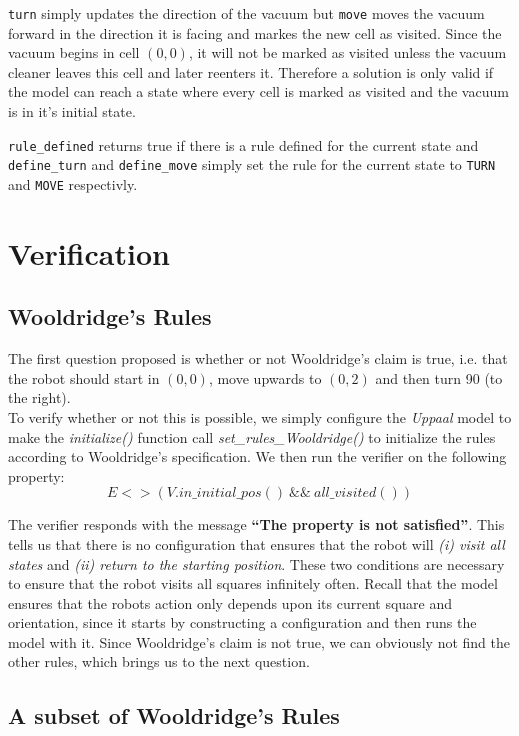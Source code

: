 \documentclass{article}
\begin{document}
    \texttt{turn} simply updates the direction of the vacuum but \texttt{move} moves the vacuum forward in the direction it is facing and markes the new cell as visited. Since the vacuum begins in cell $(0,0)$, it will not be marked as visited unless the vacuum cleaner leaves this cell and later reenters it. Therefore a solution is only valid if the model can reach a state where every cell is marked as visited and the vacuum is in it's initial state.

    \texttt{rule\_defined} returns true if there is a rule defined for the current state and \texttt{define\_turn} and \texttt{define\_move} simply set the rule for the current state to \texttt{TURN} and \texttt{MOVE} respectivly.




\section{Verification}

\subsection{Wooldridge's Rules}

The first question proposed is whether or not Wooldridge's claim is true, i.e. that the robot should start in $(0,0)$, move upwards to $(0,2)$ and then turn 90\degree{} (to the right).
\\
To verify whether or not this is possible, we simply configure the \textit{Uppaal} model to make the \textit{initialize()} function call \textit{set\_rules\_Wooldridge()} to initialize the rules according to Wooldridge's specification.
We then run the verifier on the following property:
\[ E<>(V.in\_initial\_pos() ~ \&\& ~ all\_visited()) \]

The verifier responds with the message \textbf{``The property is not satisfied''}.
This tells us that there is no configuration that ensures that the robot will \textit{(i) visit all states} and \textit{(ii) return to the starting position}. 
These two conditions are necessary to ensure that the robot visits all squares infinitely often.
Recall that the model ensures that the robots action only depends upon its current square and orientation, since it starts by constructing a configuration and then runs the model with it.
Since Wooldridge's claim is not true, we can obviously not find the other rules, which brings us to the next question.

\subsection{A subset of Wooldridge's Rules}
\end{document}
